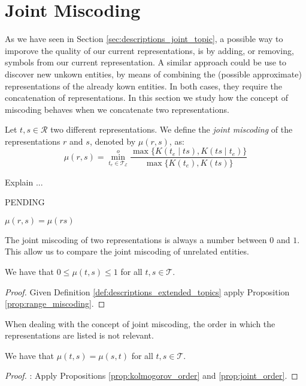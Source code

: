 %
%
\section{Joint Miscoding}
\label{sec:joint_miscoding}

As we have seen in Section \ref{sec:descriptions_joint_topic}, a possible way to imporove the quality of our current representations, is by adding, or removing, symbols from our current representation. A similar approach could be use to discover new unkown entities, by means of combining the (possible approximate) representations of the already kown entities. In both cases, they require the concatenation of representations. In this section we study how the concept of miscoding behaves when we concatenate two representations.

\begin{definition}
Let $t, s \in \mathcal{R}$ two different representations. We define the \emph{joint miscoding} of the representations $r$ and $s$, denoted by $\mu(r, s)$, as:
\[
\mu(r, s) =  \overset{o}{ \underset{t_e \in \mathcal{T}_\mathcal{E}} \min} \frac{ \max\{ K(t_e \mid ts), K(ts \mid t_e) \} } { \max\{ K(t_e), K(ts) \} }
\]
\end{definition}

Explain ...

\begin{example}
{\color{red} PENDING}
\end{example}

$\mu(r, s) = \mu(rs)$

The joint miscoding of two representations is always a number between $0$ and $1$. This allow us to compare the joint miscoding of unrelated entities.

\begin{proposition}
We have that $0 \leq \mu(t,s) \leq 1$ for all $t, s \in \mathcal{T}$.
\end{proposition}
\begin{proof}
Given Definition \ref{def:descriptions_extended_topics} apply Proposition \ref{prop:range_miscoding}.
\end{proof}

When dealing with the concept of joint miscoding, the order in which the representations are listed is not relevant.

\begin{proposition}
We have that $\mu(t,s) = \mu(s,t)$ for all $t,s \in \mathcal{T}$.
\end{proposition}
\begin{proof}
{\color{red}: Apply Propositions \ref{prop:kolmogorov_order} and \ref{prop:joint_order}.}
\end{proof}

